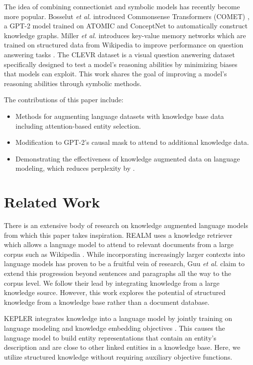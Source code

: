 \documentclass[phd,electronic,oneside,twosidetoc,letterpaper,chaptercenter,parttop,lof]{byumsphd}
\begin{document}
The idea of combining connectionist and symbolic models has recently become more popular. 
Bosselut \textit{et al.} introduced Commonsense Transformers (COMET) \cite{bosselut2019comet}, a GPT-2 model trained on ATOMIC \cite{sap2019atomic} and ConceptNet \cite{liu2004conceptnet} to automatically construct knowledge graphs.
Miller \textit{et al.} introduces key-value memory networks which are trained on structured data from Wikipedia to improve performance on question answering tasks \cite{miller2016key}.
The CLEVR dataset \cite{johnson2017clevr} is a visual question answering dataset specifically designed to test a model's reasoning abilities by minimizing biases that models can exploit.
This work shares the goal of improving a model's reasoning abilities through symbolic methods.

The contributions of this paper include:
\begin{itemize}
    \item Methods for augmenting language datasets with knowledge base data including attention-based entity selection.
    \item Modification to GPT-2's causal mask to attend to additional knowledge data.
    \item Demonstrating the effectiveness of knowledge augmented data on language modeling, which reduces perplexity by \LMLossPercentageDecrease.
\end{itemize}

\section{Related Work}

There is an extensive body of research on knowledge augmented language models from which this paper takes inspiration.
REALM uses a knowledge retriever which allows a language model to attend to relevant documents from a large corpus such as Wikipedia \cite{guu2020realm}. 
While incorporating increasingly larger contexts into language models has proven to be a fruitful vein of research, Guu \textit{et al.} claim to extend this progression beyond sentences and paragraphs all the way to the corpus level. 
We follow their lead by integrating knowledge from a large knowledge source.
However, this work explores the potential of structured knowledge from a knowledge base rather than a document database.

KEPLER integrates knowledge into a language model by jointly training on language modeling and knowledge embedding objectives \cite{wang2021kepler}.
This causes the language model to build entity representations that contain an entity's description and are close to other linked entities in a knowledge base.
Here, we utilize structured knowledge without requiring auxiliary objective functions.
\end{document}
